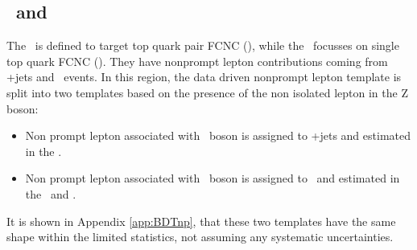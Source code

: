 
\subsection{\TTSR\ and \STSR}
The \TTSR\ is defined to target top quark pair FCNC (\tZq), while the \STSR\ focusses on single top quark FCNC (\tZ). They have nonprompt  lepton contributions coming from \DY+jets and \ttbar\ events. In this region, the data driven nonprompt  lepton template is split into two templates based on the presence of the non isolated lepton in the Z boson: 
\begin{itemize}
	\item Non prompt lepton associated with \PW\ boson is assigned to \DY+jets and estimated in the \WZCR.
	\item Non prompt lepton associated with \PZ\ boson is assigned to \ttbar\ and estimated in the \TTCR\ and \STCR.
\end{itemize}
It is shown in Appendix \ref{app:BDTnp}, that these two templates have the same shape within the limited statistics, not assuming any systematic uncertainties. 

